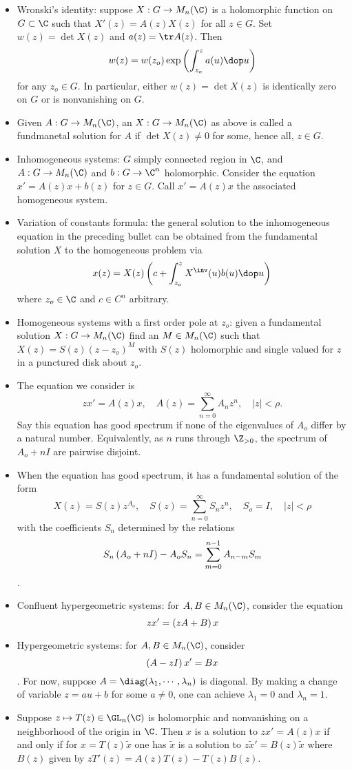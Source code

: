 \documentclass[11pt]{amsart}
\begin{document}
\begin{itemize}
  \item Wronski's identity: suppose $X:G \to M_n(\C)$ is a holomorphic function on $G\subset \C$ such that $X'(z)=A(z) X(z)$ for all $z\in G$. Set $w(z)=\det X(z)$ and $a(z)=\tr A(z)$. Then \[ w(z)= w(z_o) \Exp{\int_{z_o}^z a(u) \dop u} \] for any $z_o \in G$. In particular, either $w(z)=\det X(z)$ is identically zero on $G$ or is nonvanishing on $G$. 
  \item Given $A:G\to M_n(\C)$, an $X:G \to M_n(\C)$ as above is called a fundmanetal solution for $A$ if $\det X(z) \neq 0$ for some, hence all, $z \in G$.
  \item Inhomogeneous systems: $G$ simply connected region in $\C$, and $A:G \to M_n(\C)$ and $b: G \to \C^n$ holomorphic. Consider the equation $x' = A(z) x +b(z)$ for $z\in G$. Call $x'=A(z) x$ the associated homogeneous system. 
  \item Variation of constants formula: the general solution to the inhomogeneous equation in the preceding bullet can be obtained from the fundamental solution $X$ to the homogeneous problem via  \[ x(z)=X(z) \left( c+ \int_{z_o}^z X^\inv (u) b(u) \dop u \right) \]  where $z_o\in \C$ and $c\in C^n$ arbitrary. 
  \item Homogeneous systems with a first order pole at $z_o$: given a fundamental solution $X: G \to M_n(\C)$ find an $M \in M_n(\C)$ such that $X(z)=S(z) (z-z_o)^M$ with $S(z)$ holomorphic and single valued for $z$ in a punctured disk about $z_o$.
  \item The equation we consider is \[zx' = A(z)x, \quad A(z) = \sum_{n=0}^\infty A_n z^n, \quad |z|<\rho.  \] Say this equation has good spectrum if none of the eigenvalues of $A_o$ differ by a natural number. Equivalently, as $n$ runs through $\Z_{>0}$, the spectrum of $A_o + n I$ are pairwise disjoint. 
  \item When the equation has good spectrum, it has a fundamental solution of the form  \[ X(z)= S(z)z^{A_o}, \quad S(z)=\sum_{n=0}^\infty S_n z^n, \quad S_o=I, \quad |z|<\rho \] with the coefficients $S_n$ determined by the relations  \[S_n \left( A_o +n I \right) -A_o S_n = \sum_{m=0}^{n-1} A_{n-m} S_m\]. 
  \item Confluent hypergeometric systems: for $A,B \in M_n(\C)$, consider the equation  \[ zx' = \left( zA+B \right) x\]
  \item Hypergeometric systems: for $A,B \in M_n(\C)$, consider \[\left( A-zI \right) x' = Bx\]. For now, suppose $A= \diag(\lambda_1 , \cdots , \lambda_n)$ is diagonal.  By making a change of variable $z=au+b$ for some $a\neq 0$, one can achieve $\lambda_1 =0$ and $\lambda_n= 1$.
  \item Suppose $z\mapsto T(z) \in \GL_n(\C)$ is holomorphic and nonvanishing on a neighborhood of the origin in $\C$. Then $x$ is a solution to $zx'=A(z)x$ if and only if for $x=T(z)\tilde{x}$ one has $\tilde{x}$ is a solution to $z \tilde{x}' = B(z) \tilde{x}$ where $B(z)$ given by $zT'(z)=A(z)T(z)-T(z)B(z)$. 
\end{itemize}
\end{document}
